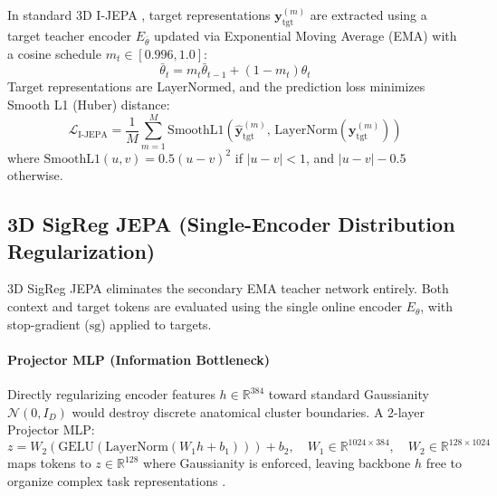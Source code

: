 \documentclass{article}
\begin{document}
In standard 3D I-JEPA \citep{assran2023ijepa}, target representations $\mathbf{y}_{\text{tgt}}^{(m)}$ are extracted using a target teacher encoder $E_{\bar{\theta}}$ updated via Exponential Moving Average (EMA) with a cosine schedule $m_t \in [0.996, 1.0]$:
\begin{equation}
    \bar{\theta}_t = m_t \bar{\theta}_{t-1} + (1 - m_t) \theta_t
\end{equation}
Target representations are LayerNormed, and the prediction loss minimizes Smooth L1 (Huber) distance:
\begin{equation}
    \mathcal{L}_{\text{I-JEPA}} = \frac{1}{M} \sum_{m=1}^M \text{SmoothL1}\left(\hat{\mathbf{y}}_{\text{tgt}}^{(m)}, \, \text{LayerNorm}(\mathbf{y}_{\text{tgt}}^{(m)})\right)
\end{equation}
where $\text{SmoothL1}(u, v) = 0.5(u - v)^2$ if $|u - v| < 1$, and $|u - v| - 0.5$ otherwise.

\subsection{3D SigReg JEPA (Single-Encoder Distribution Regularization)}

3D SigReg JEPA \citep{balestriero2025lejepa} eliminates the secondary EMA teacher network entirely. Both context and target tokens are evaluated using the single online encoder $E_\theta$, with stop-gradient ($\text{sg}$) applied to targets.

\paragraph{Projector MLP (Information Bottleneck)}
Directly regularizing encoder features $h \in \mathbb{R}^{384}$ toward standard Gaussianity $\mathcal{N}(0, I_D)$ would destroy discrete anatomical cluster boundaries. A 2-layer Projector MLP:
\begin{equation}
    z = W_2 \left( \text{GELU}(\text{LayerNorm}(W_1 h + b_1)) \right) + b_2, \quad W_1 \in \mathbb{R}^{1024 \times 384}, \quad W_2 \in \mathbb{R}^{128 \times 1024}
\end{equation}
maps tokens to $z \in \mathbb{R}^{128}$ where Gaussianity is enforced, leaving backbone $h$ free to organize complex task representations \citep{tishby2000information}.
\end{document}
